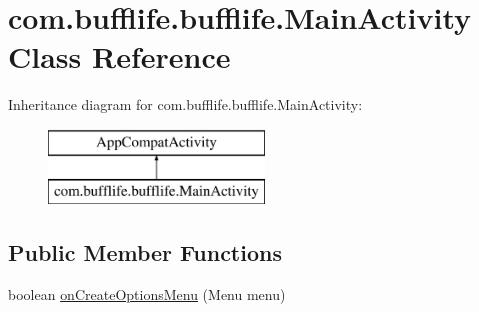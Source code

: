 \hypertarget{classcom_1_1bufflife_1_1bufflife_1_1_main_activity}{}\section{com.\+bufflife.\+bufflife.\+Main\+Activity Class Reference}
\label{classcom_1_1bufflife_1_1bufflife_1_1_main_activity}
Inheritance diagram for com.\+bufflife.\+bufflife.\+Main\+Activity\+:\begin{figure}[H]
\begin{center}
\leavevmode
\includegraphics[height=2.000000cm]{classcom_1_1bufflife_1_1bufflife_1_1_main_activity}
\end{center}
\end{figure}
\subsection*{Public Member Functions}
\begin{DoxyCompactItemize}
\item 
boolean \hyperlink{classcom_1_1bufflife_1_1bufflife_1_1_main_activity_a8970eccd15a081a309a3557e442789f1}{on\+Create\+Options\+Menu} (Menu menu)
\end{DoxyCompactItemize}
